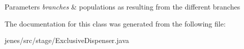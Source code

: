 \begin{DoxyParams}{Parameters}
{\em branches} & populations as resulting from the different branches \\
\hline
\end{DoxyParams}


The documentation for this class was generated from the following file\-:\begin{DoxyCompactItemize}
\item 
jenes/src/stage/Exclusive\-Dispenser.\-java\end{DoxyCompactItemize}
